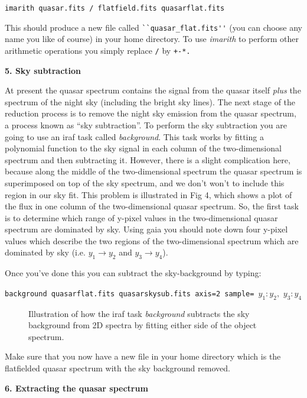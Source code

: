 {\tt imarith quasar.fits \verb,/, flatfield.fits quasarflat.fits}

This should produce a new file called \verb,``quasar_flat.fits'', (you can
choose any name you like of course) in your home directory. To use
{\it imarith} to perform other arithmetic operations you simply
replace \verb,/, by \verb,+-*.,

{\large {\bf 5. Sky subtraction}}

At present the quasar spectrum contains the signal from the quasar
itself {\it plus} the spectrum of the night sky (including the bright
sky lines). The next stage of the reduction process is to remove the
night sky emission from the quasar spectrum, a process known as ``sky
subtraction''. To perform the sky subtraction you are going to use an
{\sc iraf} task called {\it background}. This task works by fitting a
polynomial function to the sky signal in each column of the
two-dimensional spectrum and then subtracting it. However, there is a
slight complication here, because along the middle of the
two-dimensional spectrum the quasar spectrum is superimposed on top of
the sky spectrum, and we don't won't to include this region in our sky
fit. This problem is illustrated in Fig 4, which shows a plot of the
flux in one column of the two-dimensional quasar spectrum. So, the
first task is to determine which range of y-pixel values in the
two-dimensional quasar spectrum are dominated by sky. Using {\sc gaia}
you should note down four y-pixel values which describe the
two regions of the two-dimensional spectrum which are dominated by sky
(i.e. $y_1 \rightarrow y_2$ and $y_3 \rightarrow y_4$).



Once you've done this you can subtract the sky-background by typing:

{\tt background quasarflat.fits quasarskysub.fits axis=2 sample= }$y_1:y_2,$ $y_3:y_4$


\begin{figure}
\centerline{}
\caption{Illustration of how the {\sc iraf} task {\it background}
subtracts the sky background from 2D spectra by fitting either side of
the object spectrum.}
\end{figure}

Make sure that you now have a new file in your home directory which is
the flatfielded quasar spectrum with the sky background removed.


{\large {\bf 6. Extracting the quasar spectrum }}

